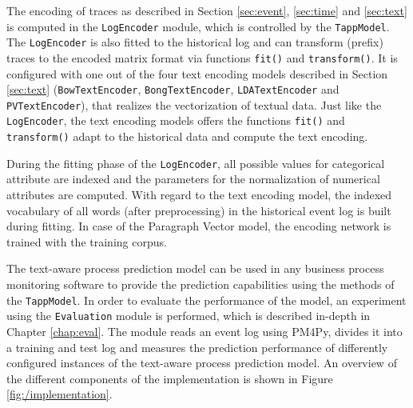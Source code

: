 The encoding of traces as described in Section \ref{sec:event}, \ref{sec:time} and \ref{sec:text} is computed in the \texttt{LogEncoder} module, which is controlled by the \texttt{TappModel}.
The \texttt{LogEncoder} is also fitted to the historical log and can transform (prefix) traces to the encoded matrix format via functions \texttt{fit()} and \texttt{transform()}.
It is configured with one out of the four text encoding models described in Section \ref{sec:text} (\texttt{BowTextEncoder},  \texttt{BongTextEncoder}, \texttt{LDATextEncoder} and  \texttt{PVTextEncoder}), that realizes the vectorization of textual data.
Just like the \texttt{LogEncoder}, the text encoding models offers the functions \texttt{fit()} and \texttt{transform()} adapt to the historical data and compute the text encoding.

During the fitting phase of the  \texttt{LogEncoder}, all possible values for categorical attribute are indexed and the parameters for the normalization of numerical attributes are computed.
With regard to the text encoding model, the indexed vocabulary of all words (after preprocessing) in the historical event log is built during fitting.
In case of the Paragraph Vector model, the encoding network is trained with the training corpus.

The text-aware process prediction model can be used in any business process monitoring software to provide the prediction capabilities using the methods of the \texttt{TappModel}.
In order to evaluate the performance of the model, an experiment using the \texttt{Evaluation} module is performed, which is described in-depth in Chapter \ref{chap:eval}.
The module reads an event log using PM4Py, divides it into a training and test log and measures the prediction performance of differently configured instances of the text-aware process prediction model.
An overview of the different components of the implementation is shown in Figure \ref{fig:/implementation}.